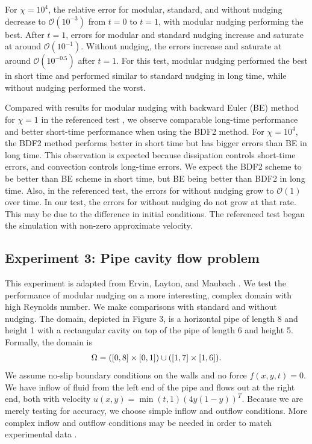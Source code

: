 \documentclass[11pt,a4paper]{article}
\begin{document}
For $\chi=10^4$, the relative error for modular, standard, and without nudging decrease to $\mathcal{O}(10^{-3})$ from $t=0$ to $t=1$, with modular nudging performing the best. After $t=1$, errors for modular and standard nudging increase and saturate at around $\mathcal{O}(10^{-1})$. Without nudging, the errors increase and saturate at around $\mathcal{O}(10^{-0.5})$ after $t=1$. For this test, modular nudging performed the best in short time and performed similar to standard nudging in long time, while without nudging performed the worst. 

Compared with results for modular nudging with backward Euler (BE) method for $\chi=1$ in the referenced test \cite{Fang:2025}, we observe comparable long-time performance and better short-time performance when using the BDF2 method. For $\chi=10^4$, the BDF2 method performs better in short time but has bigger errors than BE in long time. This observation is expected because dissipation controls short-time errors, and convection controls long-time errors. We expect the BDF2 scheme to be better than BE scheme in short time, but BE being better than BDF2 in long time. Also, in the referenced test, the errors for without nudging grow to $\mathcal{O}(1)$ over time. In our test, the errors for without nudging do not grow at that rate. This may be due to the difference in initial conditions. The referenced test began the simulation with non-zero approximate velocity.

\subsection{Experiment 3: Pipe cavity flow problem}
This experiment is adapted from Ervin, Layton, and Maubach \cite{Layton:2000}. We test the performance of modular nudging on a more interesting, complex domain with high Reynolds number. We make comparisons with standard and without nudging. The domain, depicted in Figure 3, is a horizontal pipe of length 8 and height 1 with a rectangular cavity on top of the pipe of length 6 and height 5. Formally, the domain is 
\begin{align}
    \Omega = ([0,8]\times [0,1])\cup ([1,7]\times [1,6]). \notag
\end{align}
We assume no-slip boundary conditions on the walls and no force $f(x,y,t)=0$. We have inflow of fluid from the left end of the pipe and flows out at the right end, both with velocity $u(x,y)=\min(t,1)(4y(1-y))^T$. Because we are merely testing for accuracy, we choose simple inflow and outflow conditions. More complex inflow and outflow conditions may be needed in order to match experimental data \cite{Layton:2000}.
\end{document}

